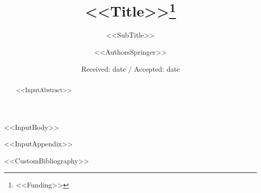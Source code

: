 \documentclass[%
nospthms,
smallextended,
numbook,
runningheads,
<<DocumentClassOptions>>]{svjour3}
\begin{document}
\title{<<Title>>\thanks{<<Funding>>}}
\subtitle{<<SubTitle>>}

\dedication{<<Dedication>>}

\author{<<AuthorsSpringer>>}

\date{Received: date / Accepted: date}

\maketitle

\begin{abstract}
<<InputAbstract>>
\end{abstract}



<<InputBody>>

\appendix
<<InputAppendix>>


<<CustomBibliography>>
\end{document}
